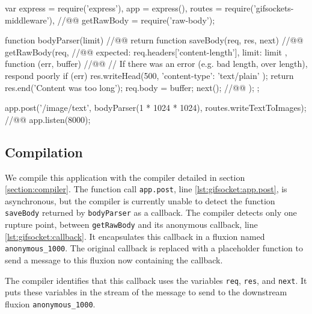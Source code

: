 \begin{code}[js, caption={Simplified version of gifsockets-server},label={lst:gifsocket}]
var express = require('express'),
    app = express(),
    routes = require('gifsockets-middleware'), //@\label{lst:gifsocket:gif-mw}@
    getRawBody = require('raw-body');

function bodyParser(limit) { //@\label{lst:gifsocket:bodyParser}@
  return function saveBody(req, res, next) { //@\label{lst:gifsocket:saveBody}@
    getRawBody(req, { //@\label{lst:gifsocket:getRawBody}@
      expected: req.headers['content-length'],
      limit: limit
    }, function (err, buffer) { //@\label{lst:gifsocket:callback}@
      // If there was an error (e.g. bad length, over length), respond poorly
      if (err) {
        res.writeHead(500, {
          'content-type': 'text/plain'
        });
        return res.end('Content was too long');
      }
      req.body = buffer;
      next(); //@\label{lst:gifsocket:next}@
    });
  };
}

app.post('/image/text', bodyParser(1 * 1024 * 1024), routes.writeTextToImages); //@\label{lst:gifsocket:app.post}@
app.listen(8000);
\end{code}


\subsection{Compilation}

We compile this application with the compiler detailed in section \ref{section:compiler}.
The function call \texttt{app.post}, line \ref{lst:gifsocket:app.post}, is asynchronous, but the compiler is currently unable to detect the function \texttt{saveBody} returned by \texttt{bodyParser} as a callback.
The compiler detects only one rupture point, between \texttt{getRawBody} and its anonymous callback, line \ref{lst:gifsocket:callback}.
It encapsulates this callback in a fluxion named \texttt{anonymous\-\_1000}.
The original callback is replaced with a placeholder function to send a message to this fluxion now containing the callback.

The compiler identifies that this callback uses the variables \texttt{req}, \texttt{res}, and \texttt{next}.
It puts these variables in the stream of the message to send to the downstream fluxion \texttt{anonymous\-\_1000}.


